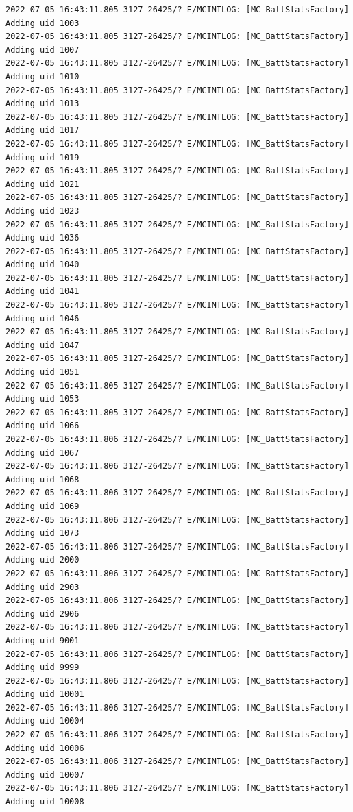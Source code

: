 \documentclass[a4paper,12pt]{book}
\begin{document}
\begin{lstlisting}
2022-07-05 16:43:11.805 3127-26425/? E/MCINTLOG: [MC_BattStatsFactory] Adding uid 1003
2022-07-05 16:43:11.805 3127-26425/? E/MCINTLOG: [MC_BattStatsFactory] Adding uid 1007
2022-07-05 16:43:11.805 3127-26425/? E/MCINTLOG: [MC_BattStatsFactory] Adding uid 1010
2022-07-05 16:43:11.805 3127-26425/? E/MCINTLOG: [MC_BattStatsFactory] Adding uid 1013
2022-07-05 16:43:11.805 3127-26425/? E/MCINTLOG: [MC_BattStatsFactory] Adding uid 1017
2022-07-05 16:43:11.805 3127-26425/? E/MCINTLOG: [MC_BattStatsFactory] Adding uid 1019
2022-07-05 16:43:11.805 3127-26425/? E/MCINTLOG: [MC_BattStatsFactory] Adding uid 1021
2022-07-05 16:43:11.805 3127-26425/? E/MCINTLOG: [MC_BattStatsFactory] Adding uid 1023
2022-07-05 16:43:11.805 3127-26425/? E/MCINTLOG: [MC_BattStatsFactory] Adding uid 1036
2022-07-05 16:43:11.805 3127-26425/? E/MCINTLOG: [MC_BattStatsFactory] Adding uid 1040
2022-07-05 16:43:11.805 3127-26425/? E/MCINTLOG: [MC_BattStatsFactory] Adding uid 1041
2022-07-05 16:43:11.805 3127-26425/? E/MCINTLOG: [MC_BattStatsFactory] Adding uid 1046
2022-07-05 16:43:11.805 3127-26425/? E/MCINTLOG: [MC_BattStatsFactory] Adding uid 1047
2022-07-05 16:43:11.805 3127-26425/? E/MCINTLOG: [MC_BattStatsFactory] Adding uid 1051
2022-07-05 16:43:11.805 3127-26425/? E/MCINTLOG: [MC_BattStatsFactory] Adding uid 1053
2022-07-05 16:43:11.805 3127-26425/? E/MCINTLOG: [MC_BattStatsFactory] Adding uid 1066
2022-07-05 16:43:11.806 3127-26425/? E/MCINTLOG: [MC_BattStatsFactory] Adding uid 1067
2022-07-05 16:43:11.806 3127-26425/? E/MCINTLOG: [MC_BattStatsFactory] Adding uid 1068
2022-07-05 16:43:11.806 3127-26425/? E/MCINTLOG: [MC_BattStatsFactory] Adding uid 1069
2022-07-05 16:43:11.806 3127-26425/? E/MCINTLOG: [MC_BattStatsFactory] Adding uid 1073
2022-07-05 16:43:11.806 3127-26425/? E/MCINTLOG: [MC_BattStatsFactory] Adding uid 2000
2022-07-05 16:43:11.806 3127-26425/? E/MCINTLOG: [MC_BattStatsFactory] Adding uid 2903
2022-07-05 16:43:11.806 3127-26425/? E/MCINTLOG: [MC_BattStatsFactory] Adding uid 2906
2022-07-05 16:43:11.806 3127-26425/? E/MCINTLOG: [MC_BattStatsFactory] Adding uid 9001
2022-07-05 16:43:11.806 3127-26425/? E/MCINTLOG: [MC_BattStatsFactory] Adding uid 9999
2022-07-05 16:43:11.806 3127-26425/? E/MCINTLOG: [MC_BattStatsFactory] Adding uid 10001
2022-07-05 16:43:11.806 3127-26425/? E/MCINTLOG: [MC_BattStatsFactory] Adding uid 10004
2022-07-05 16:43:11.806 3127-26425/? E/MCINTLOG: [MC_BattStatsFactory] Adding uid 10006
2022-07-05 16:43:11.806 3127-26425/? E/MCINTLOG: [MC_BattStatsFactory] Adding uid 10007
2022-07-05 16:43:11.806 3127-26425/? E/MCINTLOG: [MC_BattStatsFactory] Adding uid 10008

\end{lstlisting}
\end{document}
